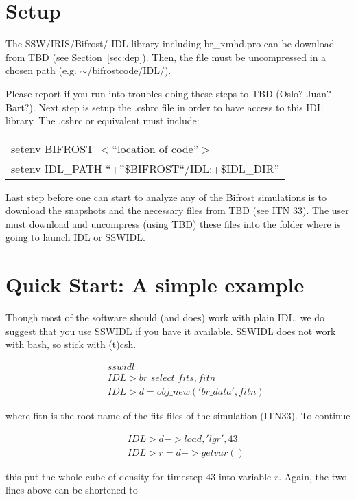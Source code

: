 \documentclass[12pt,preprint]{aastex}
\begin{document}
\section{Setup}

The SSW/IRIS/Bifrost/ IDL library including br\_xmhd.pro can be download from TBD (see 
Section~\ref{sec:dep}). Then, the file must be uncompressed in a chosen path 
(e.g. $\sim$/bifrostcode/IDL/).
	
Please report if you run into troubles doing these steps to TBD (Oslo? Juan? Bart?). 
Next step is setup the .cshrc file in order to have access to this IDL library. 
The .cshrc or equivalent must include: 

\begin{tabular}{l}
setenv BIFROST $<$``location of code''$>$ \\
setenv IDL\_PATH ``+''\$BIFROST``/IDL:+\$IDL\_DIR'' \\
\end{tabular}

Last step before one can start to analyze any of the Bifrost simulations is to download the snapshots
and the necessary files from TBD (see ITN 33). 
The user must download and uncompress (using TBD) these files into the folder where is going to 
launch IDL or SSWIDL.  

\section{Quick Start: A simple example}

Though most of the software should (and does) work with plain IDL, we do suggest 
that you use SSWIDL if you have it available. SSWIDL does not work with bash, so 
stick with (t)csh.

\begin{eqnarray}
&& sswidl \\
&& IDL> br\_select\_fits,fitn \\
&& IDL> d=obj\_new('br\_data',fitn) 
\end{eqnarray}

where fitn is the root name of the fits files of the simulation (ITN33). To continue  

\begin{eqnarray}
&& IDL> d->load,'lgr',43 ~\label{ex:load}\\
&& IDL> r=d->getvar() 
\end{eqnarray}

this put the whole cube of density for timestep 43 into variable $r$. 
Again, the two lines above can be shortened to
\end{document}
